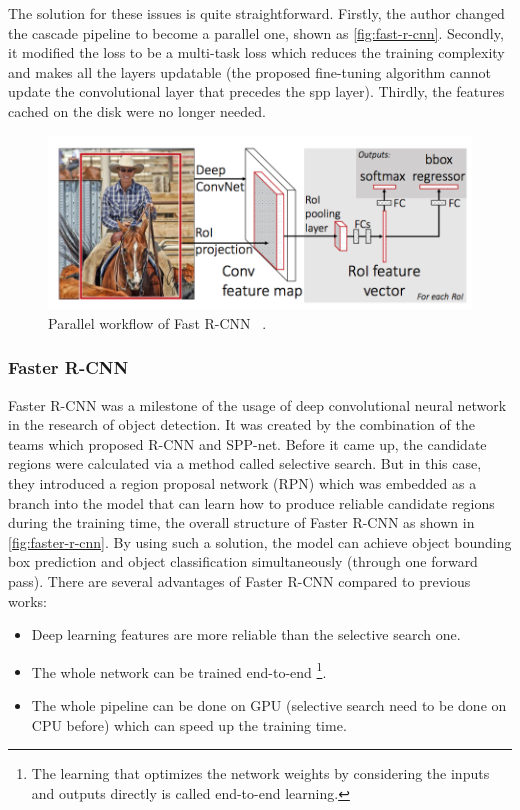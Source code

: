 The solution for these issues is quite straightforward. Firstly, the author
changed the cascade pipeline to become a parallel one, shown as
\autoref{fig:fast-r-cnn}. 
Secondly, it modified the loss to be a multi-task loss which reduces the
training complexity and makes all the layers updatable (the proposed fine-tuning
algorithm cannot update the convolutional layer that precedes the spp layer).
Thirdly, the features cached on the disk were no longer needed.

\begin{figure}
    \begin{center}
    \includegraphics[scale=0.7]{figures/fast_r_cnn.png}
    \end{center}
    \caption{Parallel workflow of Fast R-CNN
    ~\protect\cite{fast-r-cnn-paper-2015}.}
    \label{fig:fast-r-cnn}
\end{figure}


\subsubsection{Faster R-CNN}

Faster R-CNN \cite{faster-r-cnn-paper-2015} was a milestone of the usage of 
deep convolutional neural network in the research of object detection. It was 
created by the combination of the teams which proposed R-CNN and SPP-net.
Before it came up, the candidate regions were calculated via a method called 
selective search. 
But in this case, they introduced a region proposal network (RPN) which was 
embedded as a branch into the model that can learn how to
produce reliable candidate regions during the training time, the overall
structure of Faster R-CNN as shown in \autoref{fig:faster-r-cnn}.
By using such a solution, the model can achieve object bounding box prediction 
and object classification simultaneously (through one 
forward pass). There are several advantages of Faster R-CNN compared to 
previous works:

\begin{itemize}
    \item Deep learning features are more reliable than the selective search one.
    \item The whole network can be trained end-to-end \footnote{The learning 
    that optimizes the network weights by considering the inputs and outputs 
    directly is called end-to-end learning. }.
    \item The whole pipeline can be done on GPU (selective search need to be
    done on CPU before) which can speed up the training time.
\end{itemize}


